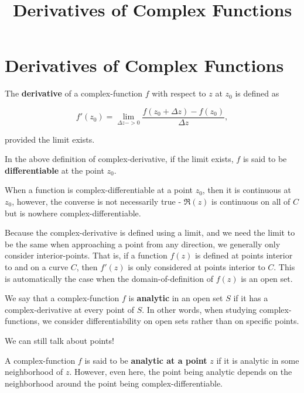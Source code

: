 \documentclass{article}
\title{Derivatives of Complex Functions}
\begin{document}
\section{Derivatives of Complex Functions}

\begin{definition}
The \textbf{derivative} of a \@{complex-function} $f$ with respect to $z$ at $z_0$ is defined as

\[ f'(z_0) = \lim_{\Delta z -> 0} \frac{f(z_0 + \Delta z) - f(z_0)}{\Delta z}, \tag{a} \]

provided the \@{limit} exists.
\end{definition}

\begin{definition}
In the above definition of \@{complex-derivative}, if the \@{limit} exists, $f$ is said to be \textbf{differentiable} at the \@{point} $z_0$.
\end{definition}

\begin{remark}
When a \@{function} is \@{complex-differentiable} at a point $z_0$, then it is \@{continuous} at $z_0$, however, the converse is not necessarily true - $\Re{(z)}$ is \@{continuous} on all of $C$ but is nowhere \@{complex-differentiable}.
\end{remark}

Because the \@{complex-derivative} is defined using a \@{limit}, and we need the \@{limit} to be the same when approaching a \@{point} from any direction, we generally only consider \@{interior-points}. That is, if a \@{function} $f(z)$ is defined at \@{points} \@{interior} to and on a curve $C$, then $f'(z)$ is only considered at points interior to $C$. This is automatically the case when the \@{domain-of-definition} of $f(z)$ is an \@{open} set.

\begin{definition}[Analytic]
We say that a \@{complex-function} $f$ is \textbf{analytic} in an open set $S$ if it has a \@{complex-derivative} at every \@{point} of $S$. In other words, when studying \@{complex-functions}, we consider differentiability on \@{open} \@{sets} rather than on specific \@{points}.
\end{definition}

We can still talk about points!

\begin{definition}
A \@{complex-function} $f$ is said to be \textbf{analytic at a point} $z$ if it is \@{analytic} in some \@{neighborhood} of $z$. However, even here, the \@{point} being \@{analytic} depends on the \@{neighborhood} around the point being \@{complex-differentiable}.
\end{definition}
\end{document}
